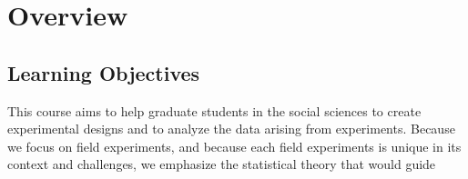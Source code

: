 \documentclass[letterpaper]{inzane_syllabus} %
\begin{document}

\makeprofile %

\section{Overview}



\subsection{Learning Objectives}

This course aims to help graduate students in the social sciences to create
experimental designs and to analyze the data arising from experiments. Because
we focus on field experiments, and because each field experiments is unique in
its context and challenges, we emphasize the statistical theory that would guide 
\end{document}
